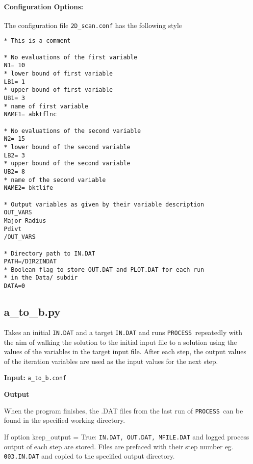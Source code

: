 \documentclass[11pt,a4paper]{report}
\newcommand{\process}{\mbox{\texttt{PROCESS}}}
\begin{document}
\paragraph{Configuration Options:}

The configuration file \texttt{2D\_scan.conf} has the following style
\begin{framed}
\begin{verbatim}
* This is a comment

* No evaluations of the first variable
N1= 10
* lower bound of first variable
LB1= 1
* upper bound of first variable
UB1= 3
* name of first variable
NAME1= abktflnc

* No evaluations of the second variable
N2= 15
* lower bound of the second variable
LB2= 3
* upper bound of the second variable
UB2= 8
* name of the second variable
NAME2= bktlife

* Output variables as given by their variable description
OUT_VARS
Major Radius
Pdivt
/OUT_VARS

* Directory path to IN.DAT
PATH=/DIR2INDAT
* Boolean flag to store OUT.DAT and PLOT.DAT for each run
* in the Data/ subdir
DATA=0
\end{verbatim}
\end{framed}

\subsection{a\_to\_b.py}

Takes an initial \texttt{IN.DAT} and a target \texttt{IN.DAT} and runs
\process\ repeatedly with the aim of walking the solution to the initial input
file to a solution using the values of the variables in the target input file.
After each step, the output values of the iteration variables are used as the
input values for the next step.

\begin{description}
\item{\textbf{Input:}}
\texttt{a\_to\_b.conf}

\item{\textbf{Output}} 

When the program finishes, the .DAT files from the last run of \process\ can
be found in the specified working directory.

If option keep\_output = True:
\texttt{IN.DAT, OUT.DAT, MFILE.DAT} and logged process output
of each step are stored. Files are prefaced with their step number
eg. \texttt{003.IN.DAT} and copied to the specified output directory.

\end{description}
\end{document}

